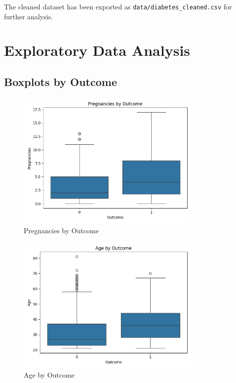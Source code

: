 \documentclass[12pt,a4paper]{article}
\begin{document}
The cleaned dataset has been exported as \texttt{data/diabetes\_cleaned.csv} for further analysis.

\section{Exploratory Data Analysis}

\subsection{Boxplots by Outcome}

\begin{figure}[H]
\centering
\includegraphics[width=0.8\textwidth]{../plots/boxplot_Pregnancies.png}
\caption{Pregnancies by Outcome}
\end{figure}

\begin{figure}[H]
\centering
\includegraphics[width=0.8\textwidth]{../plots/boxplot_Age.png}
\caption{Age by Outcome}
\end{figure}
\end{document}

